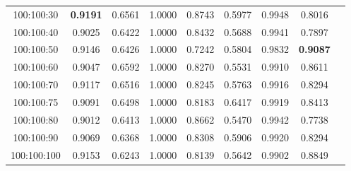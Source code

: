 \begin{table}[ht]
{\begin{tabular}{ccccccccc}
            100:100:30                            & \textbf{0.9191}                               & 0.6561                                         & 1.0000                      & 0.8743             & 0.5977           & 0.9948               & 0.8016              \\
            100:100:40                            & 0.9025                                        & 0.6422                                         & 1.0000                      & 0.8432             & 0.5688           & 0.9941               & 0.7897              \\
            100:100:50                            & 0.9146                                        & 0.6426                                         & 1.0000                      & 0.7242             & 0.5804           & 0.9832               & \textbf{0.9087}     \\
            100:100:60                            & 0.9047                                        & 0.6592                                         & 1.0000                      & 0.8270             & 0.5531           & 0.9910               & 0.8611              \\
            100:100:70                            & 0.9117                                        & 0.6516                                         & 1.0000                      & 0.8245             & 0.5763           & 0.9916               & 0.8294              \\
            100:100:75                            & 0.9091                                        & 0.6498                                         & 1.0000                      & 0.8183             & 0.6417           & 0.9919               & 0.8413              \\
            100:100:80                            & 0.9012                                        & 0.6413                                         & 1.0000                      & 0.8662             & 0.5470           & 0.9942               & 0.7738              \\
            100:100:90                            & 0.9069                                        & 0.6368                                         & 1.0000                      & 0.8308             & 0.5906           & 0.9920               & 0.8294              \\
            100:100:100                           & 0.9153                                        & 0.6243                                         & 1.0000                      & 0.8139             & 0.5642           & 0.9902               & 0.8849              \\

\end{tabular}}
\end{table}
